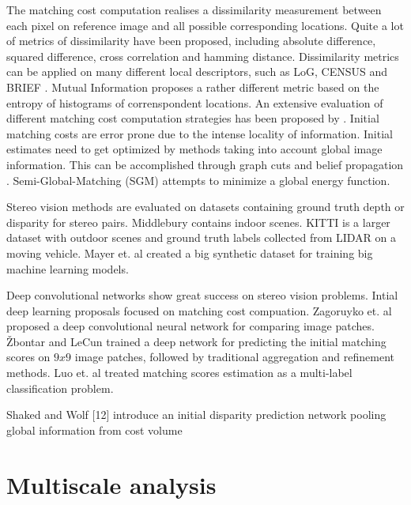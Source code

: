 \documentclass[10pt]{article}
\begin{document}
The matching cost computation realises a dissimilarity measurement between each pixel on reference image and all possible corresponding locations. Quite a lot of metrics of dissimilarity have been proposed, including  absolute difference, squared difference, cross correlation and hamming distance. Dissimilarity metrics can be applied on many different local descriptors, such as LoG, CENSUS \cite{Zabih1996ACorrespondence} and BRIEF \cite{Calonder2010}. Mutual Information \cite{Viola1997} proposes a rather different metric based on the entropy of histograms of correnspondent locations. An extensive evaluation of different matching cost computation strategies has been proposed by \cite{Hirschmuller2007}. Initial matching costs are error prone due to the intense locality of information. Initial estimates need to get optimized by methods taking into account global image information. This can be accomplished through graph cuts \cite{Kolmogorov, Boykov2001} and belief propagation \cite{Klaus2006}. Semi-Global-Matching (SGM) \cite{Hirschmuller2008StereoInformation} attempts to minimize a global energy function.

Stereo vision methods are evaluated on datasets containing ground truth depth or disparity for stereo pairs. Middlebury \cite{Scharstein2014} contains indoor scenes. KITTI \cite{Menze2015ISA, Menze2018JPRS} is a larger dataset with outdoor scenes and ground truth labels collected from LIDAR on a moving vehicle. Mayer et. al \cite{Mayer2016ALD} created a big synthetic dataset for training big machine learning models.

Deep convolutional networks show great success on stereo vision problems. Intial deep learning proposals focused on matching cost compuation. Zagoruyko et. al \cite{Zagoruyko2015LearningNetworks} proposed a deep convolutional neural network for comparing image patches. \v{Z}bontar and LeCun \cite{Zbontar_2015_CVPR} trained a deep network for predicting the initial matching scores on $9x9$ image patches, followed by traditional aggregation and refinement methods. Luo et. al \cite{Luo2016EfficientMatching} treated matching scores estimation as a multi-label classification problem.

Shaked and Wolf [12] introduce an initial disparity prediction network pooling global information from cost volume

\section{Multiscale analysis}
\end{document}
